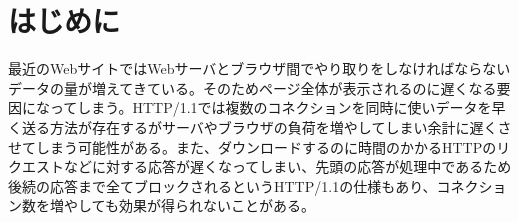 \documentclass[a4j,9pt,twocolumn]{jsarticle}
\begin{document}


\section{はじめに}
最近のWebサイトではWebサーバとブラウザ間でやり取りをしなければならないデータの量が増えてきている。そのためページ全体が表示されるのに遅くなる要因になってしまう。HTTP/1.1では複数のコネクションを同時に使いデータを早く送る方法が存在するがサーバやブラウザの負荷を増やしてしまい余計に遅くさせてしまう可能性がある。また、ダウンロードするのに時間のかかるHTTPのリクエストなどに対する応答が遅くなってしまい、先頭の応答が処理中であるため後続の応答まで全てブロックされるというHTTP/1.1の仕様もあり、コネクション数を増やしても効果が得られないことがある。
\end{document}
